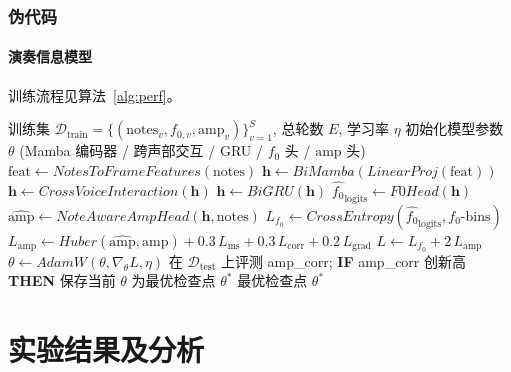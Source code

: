 \documentclass[a4paper, UTF8, zihao=-4, fontset=fandol]{ctexart}
\begin{document}
\subsubsection{伪代码}

\paragraph{演奏信息模型}\quad
训练流程见算法~\ref{alg:perf}。

\begin{algorithm}[H]
\caption{演奏信息模型训练流程}\label{alg:perf}
\begin{algorithmic}[1]
\REQUIRE 训练集 $\mathcal{D}_{\text{train}} = \{(\text{notes}_v, f_{0,v}, \mathrm{amp}_v)\}_{v=1}^{S}$, 总轮数 $E$, 学习率 $\eta$
\STATE 初始化模型参数 $\theta$ (Mamba 编码器 / 跨声部交互 / GRU / $f_0$ 头 / $\mathrm{amp}$ 头)
\STATE $\text{feat} \leftarrow \textit{NotesToFrameFeatures}(\text{notes})$ 
\STATE $\mathbf{h} \leftarrow \textit{BiMamba}(\textit{LinearProj}(\text{feat}))$ 
\STATE $\mathbf{h} \leftarrow \textit{CrossVoiceInteraction}(\mathbf{h})$ 
\STATE $\mathbf{h} \leftarrow \textit{BiGRU}(\mathbf{h})$ 
\STATE $\hat{f_0}_{\text{logits}} \leftarrow \textit{F0Head}(\mathbf{h})$ 
\STATE $\hat{\mathrm{amp}} \leftarrow \textit{NoteAwareAmpHead}(\mathbf{h}, \text{notes})$ 
\STATE $L_{f_0} \leftarrow \textit{CrossEntropy}(\hat{f_0}_{\text{logits}}, f_0\text{-bins})$ 
\STATE $L_{\mathrm{amp}} \leftarrow \textit{Huber}(\hat{\mathrm{amp}}, \mathrm{amp}) + 0.3\,L_{\text{ms}} + 0.3\,L_{\text{corr}} + 0.2\,L_{\text{grad}}$
\STATE $L \leftarrow L_{f_0} + 2\,L_{\mathrm{amp}}$
\STATE $\theta \leftarrow \textit{AdamW}(\theta, \nabla_{\theta} L, \eta)$
\ENDFOR
\STATE 在 $\mathcal{D}_{\text{test}}$ 上评测 amp\_corr; \textbf{IF} amp\_corr 创新高 \textbf{THEN} 保存当前 $\theta$ 为最优检查点 $\theta^{*}$
\ENDFOR
\ENSURE 最优检查点 $\theta^{*}$
\end{algorithmic}
\end{algorithm}

\section{实验结果及分析}
\end{document}
